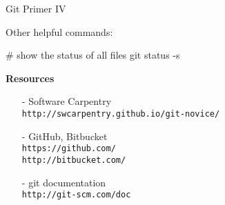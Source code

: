 \begin{frame}[fragile]{Git Primer IV}
  
  \vspace{0.2cm}
  Other helpful commands:
  \begin{mlineshell}
    # show the status of all files
    git status -s
  \end{mlineshell}

  \vspace{0.4cm}

  \textbf{Resources}
  \vspace{0.15cm}
  \begin{itemize}
    \itemsep8pt
    \item[-] Software Carpentry\\
      \texttt{http://swcarpentry.github.io/git-novice/}
    \item[-] GitHub, Bitbucket\\ 
      \texttt{https://github.com/}\\
      \texttt{http://bitbucket.com/}
    \item[-] git documentation\\
      \texttt{http://git-scm.com/doc}

    \end{itemize}

\end{frame}

